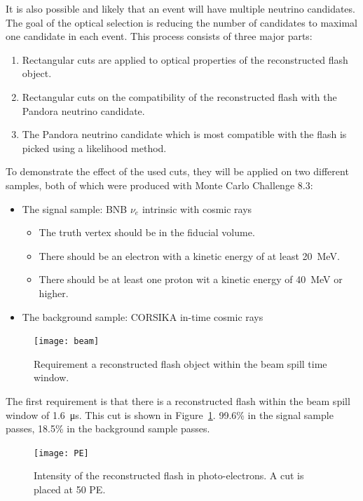 It is also possible and likely that an event will have multiple neutrino candidates. The goal of the optical selection is reducing the number of candidates to maximal one candidate in each event. This process consists of three major parts:
\begin{enumerate}
\item Rectangular cuts are applied to optical properties of the reconstructed flash object.
\item Rectangular cuts on the compatibility of the reconstructed flash with the Pandora neutrino candidate.
\item The Pandora neutrino candidate which is most compatible with the flash is picked using a likelihood method.
\end{enumerate}

To demonstrate the effect of the used cuts, they will be applied on two different samples, both of which were produced with Monte Carlo Challenge 8.3:
\begin{itemize}
\item The signal sample: BNB $\nu_e$ intrinsic with cosmic rays
\begin{itemize}
\item The truth vertex should be in the fiducial volume.
\item There should be an electron with a kinetic energy of at least \SI{20}{\MeV}.
\item There should be at least one proton wit a kinetic energy of \SI{40}{\MeV} or higher.
\end{itemize}
\item The background sample: CORSIKA in-time cosmic rays
\end{itemize}

\begin{figure}[!htbp]
\centering
\texttt{[image: beam]}
\caption{Requirement a reconstructed flash object within the beam spill time window.} 
\label{fig:beam}
\end{figure}

The first requirement is that there is a reconstructed flash within the beam spill window of \SI{1.6}{\micro\s}. This cut is shown in Figure~\ref{fig:beam}. 99.6\% in the signal sample passes, 18.5\% in the background sample passes.

\begin{figure}[htbp]
\centering
\texttt{[image: PE]}
\caption{Intensity of the reconstructed flash in photo-electrons. A cut is placed at 50 PE.} 
\label{fig:PE}
\end{figure}

